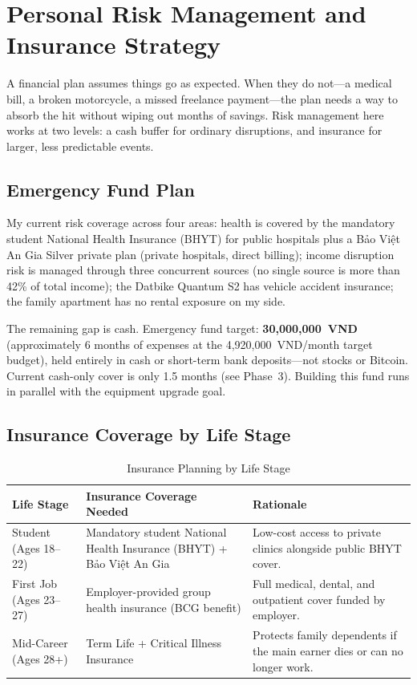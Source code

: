 \chapter{Personal Risk Management and Insurance Strategy}

A financial plan assumes things go as expected. When they do not---a medical bill, a broken motorcycle, a missed freelance payment---the plan needs a way to absorb the hit without wiping out months of savings. Risk management here works at two levels: a cash buffer for ordinary disruptions, and insurance for larger, less predictable events.

\section{Emergency Fund Plan}

My current risk coverage across four areas: health is covered by the mandatory student National Health Insurance (BHYT) for public hospitals plus a Bảo Việt An Gia Silver private plan (private hospitals, direct billing); income disruption risk is managed through three concurrent sources (no single source is more than 42\% of total income); the Datbike Quantum S2 has vehicle accident insurance; the family apartment has no rental exposure on my side.

The remaining gap is cash. Emergency fund target: \textbf{30,000,000~VND} (approximately 6 months of expenses at the 4,920,000~VND/month target budget), held entirely in cash or short-term bank deposits---not stocks or Bitcoin. Current cash-only cover is only 1.5 months (see Phase~3). Building this fund runs in parallel with the equipment upgrade goal.

\section{Insurance Coverage by Life Stage}

\begin{table}[h!]
\caption{Insurance Planning by Life Stage}
\label{tab:insurance_stages}
\begin{tabularx}{\linewidth}{@{}lLL@{}}
\toprule
\textbf{Life Stage} & \textbf{Insurance Coverage Needed} & \textbf{Rationale} \\
\midrule
Student (Ages 18--22)   & Mandatory student National Health Insurance (BHYT) + Bảo Việt An Gia & Low-cost access to private clinics alongside public BHYT cover. \\[6pt]
First Job (Ages 23--27) & Employer-provided group health insurance (BCG benefit) & Full medical, dental, and outpatient cover funded by employer. \\[6pt]
Mid-Career (Ages 28+)   & Term Life + Critical Illness Insurance & Protects family dependents if the main earner dies or can no longer work. \\
\bottomrule
\end{tabularx}
\end{table}

